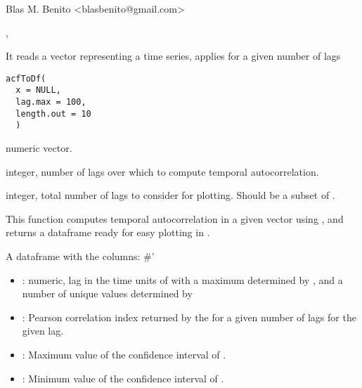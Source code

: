 \documentclass[letterpaper]{book}
\begin{document}
%
\begin{Author}\relax
Blas M. Benito  <blasbenito@gmail.com>
\end{Author}
%
\begin{SeeAlso}\relax
{}, 
\end{SeeAlso}
%
\begin{Description}\relax
It reads a vector representing a time series, applies  for a given number of lags
\end{Description}
%
\begin{Usage}
\begin{verbatim}
acfToDf(
  x = NULL,
  lag.max = 100,
  length.out = 10
  )
\end{verbatim}
\end{Usage}
%
\begin{Arguments}
\begin{ldescription}
\item[\code{x}] numeric vector.

\item[\code{lag.max}] integer, number of lags over which to compute temporal autocorrelation.

\item[\code{length.out}] integer, total number of lags to consider for plotting. Should be a subset of .
\end{ldescription}
\end{Arguments}
%
\begin{Details}\relax
This function computes temporal autocorrelation in a given vector using , and returns a dataframe ready for easy plotting in .
\end{Details}
%
\begin{Value}
A dataframe with the columns:
\#' \begin{itemize}

\item {}: numeric, lag in the time units of  with a maximum determined by , and a number of unique values determined by 
\item {}: Pearson correlation index returned by the  for a given number of lags for the given lag.
\item {}: Maximum value of the confidence interval of .
\item {}: Minimum value of the confidence interval of .

\end{itemize}

\end{Value}
\end{document}
